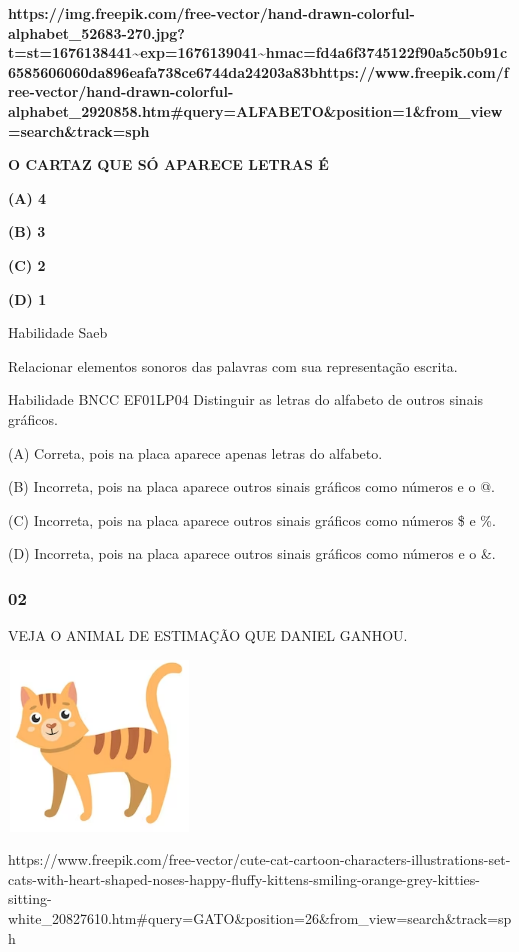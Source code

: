 \textbf{https://img.freepik.com/free-vector/hand-drawn-colorful-alphabet\_52683-270.jpg?t=st=1676138441\textasciitilde{}exp=1676139041\textasciitilde{}hmac=fd4a6f3745122f90a5c50b91c6585606060da896eafa738ce6744da24203a83bhttps://www.freepik.com/free-vector/hand-drawn-colorful-alphabet\_2920858.htm\#query=ALFABETO\&position=1\&from\_view=search\&track=sph}

\textbf{O CARTAZ QUE SÓ APARECE LETRAS É}

\textbf{(A) 4}

\textbf{(B) 3}

\textbf{(C) 2 }

\textbf{(D) 1}

Habilidade Saeb

Relacionar elementos sonoros das palavras com sua representação escrita.

Habilidade BNCC EF01LP04 Distinguir as letras do alfabeto de outros
sinais gráficos.

(A) Correta, pois na placa aparece apenas letras do alfabeto.

(B) Incorreta, pois na placa aparece outros sinais gráficos como números
e o @.

(C) Incorreta, pois na placa aparece outros sinais gráficos como números
\$ e \%.

(D) Incorreta, pois na placa aparece outros sinais gráficos como números
e o \&.

\subsubsection{02}\label{section-27}

VEJA O ANIMAL DE ESTIMAÇÃO QUE DANIEL GANHOU.

\includegraphics[width=1.91250in,height=1.79167in]{media/image187.png}

https://www.freepik.com/free-vector/cute-cat-cartoon-characters-illustrations-set-cats-with-heart-shaped-noses-happy-fluffy-kittens-smiling-orange-grey-kitties-sitting-white\_20827610.htm\#query=GATO\&position=26\&from\_view=search\&track=sph

